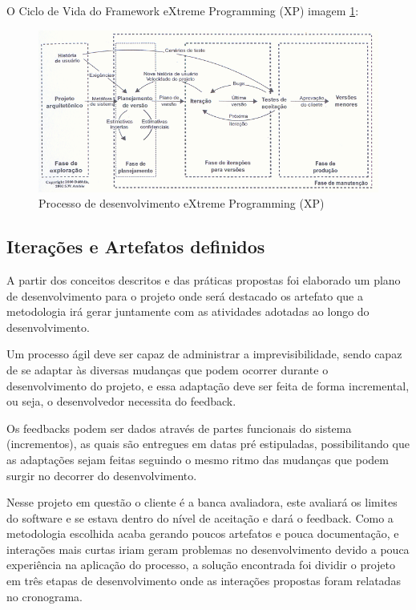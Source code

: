 \documentclass{automatextcc}
\begin{document}
O Ciclo de Vida do Framework eXtreme Programming (XP) imagem \ref{img1}: 
 \begin{figure}[h!]
    \centering
	\includegraphics[scale=0.85]{cicloXp.png}
	\caption{Processo	de	desenvolvimento	eXtreme Programming (XP)}
	\label{img1}
\end{figure}

\subsection{Iterações e Artefatos definidos}

A partir dos conceitos descritos e das práticas propostas foi elaborado um plano de desenvolvimento para o projeto onde será destacado os artefato que a metodologia irá gerar juntamente com as atividades adotadas ao longo do desenvolvimento.

Um processo ágil deve ser capaz de administrar a imprevisibilidade, sendo capaz de se adaptar às diversas mudanças que podem ocorrer durante o desenvolvimento do projeto, e essa adaptação deve ser feita de forma incremental, ou seja, o desenvolvedor necessita do feedback.

Os feedbacks podem ser dados através de partes funcionais do sistema (incrementos), as quais são entregues em datas pré estipuladas, possibilitando que as adaptações sejam feitas seguindo o mesmo ritmo das mudanças que podem surgir no decorrer do desenvolvimento.

 Nesse projeto em questão o cliente é a banca avaliadora, este avaliará os limites do software e se estava dentro do nível de aceitação e dará o feedback. Como a metodologia escolhida acaba gerando poucos artefatos e pouca documentação, e interações mais curtas iriam geram problemas no desenvolvimento devido a pouca experiência na aplicação do processo, a solução encontrada foi dividir o projeto em três etapas de desenvolvimento onde as interações propostas foram relatadas no cronograma.
 
\end{document}
